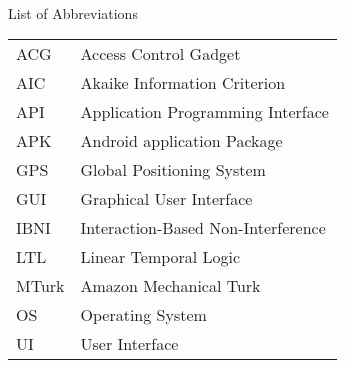 
\renewcommand{\baselinestretch}{1}
\small\normalsize
\hbox{\ }

\vspace{-3em}


\begin{center}
\large{List of Abbreviations}
\end{center} 

\vspace{3pt}

\begin{tabular}{ll}
ACG & Access Control Gadget \\
AIC & Akaike Information Criterion \\
API & Application Programming Interface \\
APK & Android application Package \\
GPS & Global Positioning System \\
GUI  & Graphical User Interface \\
IBNI & Interaction-Based Non-Interference \\
LTL & Linear Temporal Logic \\
MTurk & Amazon Mechanical Turk \\
OS & Operating System \\
UI & User Interface \\
\end{tabular}
